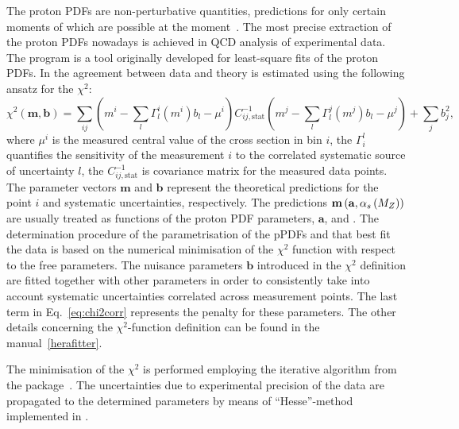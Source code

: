 The proton PDFs are non-perturbative quantities, predictions for only certain moments of which are possible at the moment~\cite{pdfmoments}. The most precise extraction of the proton PDFs nowadays is achieved in QCD analysis of experimental data. The \herafitter program is a tool originally developed for least-square fits of the proton PDFs. In \herafitter the agreement between data and theory is estimated using the following ansatz for the $\chi^2$:
\begin{equation}
 \chi^2\left( \mathbf{m},\mathbf{b}\right) = \sum_{ij}{\left( m^i -\sum_{l}{\Gamma_l^i\left( m^i\right)b_l - \mu^i }\right) C^{-1}_{ij,\text{stat}} \left( m^j -\sum_{l}{\Gamma_l^j\left( m^j\right)b_l - \mu^j }\right) } + \sum_{j}{b_j^2},
 \label{eq:chi2corr}
\end{equation}
where $\mu^i$ is the measured central value of the cross section in bin $i$, the $\Gamma_i^l$ quantifies the sensitivity of the measurement $i$ to the correlated systematic source of uncertainty $l$, the $C^{-1}_{ij,\text{stat}}$ is covariance matrix for the measured data points. The parameter vectors $\mathbf{m}$ and $\mathbf{b}$ represent the theoretical predictions for the point $i$ and systematic uncertainties, respectively. The predictions $\mathbf{m}\left( \mathbf{a},\mbox{$\alpha_{s}\left(M_{Z}\right)$}\right)$ are usually treated as functions of the proton PDF parameters, $\mathbf{a}$,  and \asz. The determination procedure of the parametrisation of the pPDFs and \as that best fit the data is based on the numerical minimisation of the $\chi^2$ function with respect to the free parameters. The nuisance parameters $\mathbf{b}$ introduced in the $\chi^2$ definition are fitted together with other parameters in order to consistently take into account systematic uncertainties correlated across measurement points. The last term in Eq.~\eqref{eq:chi2corr} represents the penalty for these parameters. The other details concerning the $\chi^2$-function definition can be found in the \herafitter manual~\ref{herafitter}.

The minimisation of the $\chi^2$ is performed employing the iterative \migrad algorithm from the \minuit package~\cite{minuit see britzger}. The uncertainties due to experimental precision of the data are propagated to the determined parameters by means of ``Hesse''-method implemented in \minuit.

